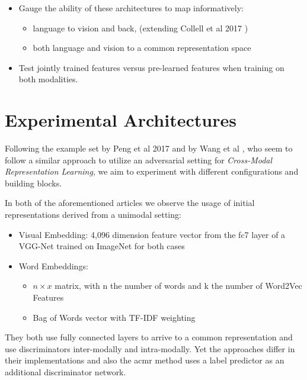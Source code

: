 \documentclass[12pt]{article}
\begin{document}
 \begin{itemize} 
    \item Gauge the ability of these architectures to map informatively:
       \begin{itemize} 
        \item language to vision and back, (extending Collell et al 2017 \cite{collell})
          \item both language and vision to a common representation space
       \end{itemize} 

    \item
      Test jointly trained features versus pre-learned features when training on both modalities.
 \end{itemize} 

\section{Experimental Architectures}


Following the example set by Peng et al 2017 \cite{DBLP:journals/corr/abs-1710-05106} and by Wang et al \cite{acmr}, who seem to follow a similar approach to utilize an adversarial setting \cite{2014arXiv1406.2661G} for \textit{Cross-Modal Representation Learning}, we aim to experiment with different configurations and building blocks.

In both of the aforementioned articles we observe the usage of initial representations derived from a unimodal setting:

 \begin{itemize} 
  \item{Visual Embedding:} 4,096 dimension feature vector from the fc7 layer of a VGG-Net trained on ImageNet for both cases
  \item{Word Embeddings:} 
     \begin{itemize} 
      \item $n \times x$ matrix, with n the number of words and k the number of Word2Vec Features \cite{DBLP:journals/corr/MikolovSCCD13}
      \item Bag of Words vector with TF-IDF weighting

     \end{itemize} 
 \end{itemize} 

They both use fully connected layers to arrive to a common representation and use discriminators inter-modally and intra-modally. Yet the approaches differ in their implementations and also the acmr method uses a label predictor as an additional discriminator network.
\end{document}
